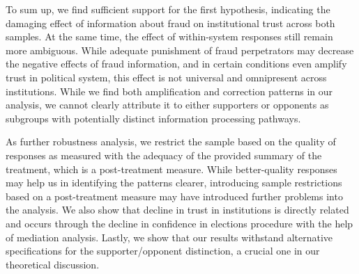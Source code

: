 \documentclass[11pt, ngerman,english,a4]{article}
\begin{document}

To sum up, we find sufficient support for the first hypothesis, indicating the damaging effect of information about fraud on institutional trust across both samples. At the same time, the effect of within-system responses still remain more ambiguous. While adequate punishment of fraud perpetrators may decrease the negative effects of fraud information, and in certain conditions even amplify trust in political system, this effect is not universal and omnipresent across institutions. While we find both amplification and correction patterns in our analysis, we cannot clearly attribute it to either supporters or opponents as subgroups with potentially distinct information processing pathways.

As further robustness analysis, we restrict the sample based on the quality of responses as measured with the adequacy of the provided summary of the treatment, which is a post-treatment measure. While better-quality responses may help us in identifying the patterns clearer, introducing sample restrictions based on a post-treatment measure may have introduced further problems into the analysis.   
We also show that decline in trust in institutions is directly related and occurs through the decline in confidence in elections procedure with the help of mediation analysis. Lastly, we show that our results withstand alternative specifications for the supporter/opponent distinction, a crucial one in our theoretical discussion.  

%
\end{document}

